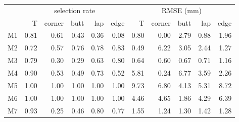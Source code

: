 \begin{tabular}{lrrrrrrrrrr}
\toprule
 & \multicolumn{5}{c}{selection rate} & \multicolumn{5}{c}{RMSE (mm)} \\
 & T & corner & butt & lap & edge & T & corner & butt & lap & edge \\
\midrule
M1 & 0.81 & 0.61 & 0.43 & 0.36 & 0.08 & 0.80 & 0.00 & 2.79 & 0.88 & 1.96 \\
M2 & 0.72 & 0.57 & 0.76 & 0.78 & 0.83 & 0.49 & 6.22 & 3.05 & 2.44 & 1.27 \\
M3 & 0.79 & 0.30 & 0.29 & 0.63 & 0.80 & 0.64 & 0.60 & 0.67 & 0.71 & 1.16 \\
M4 & 0.90 & 0.53 & 0.49 & 0.73 & 0.52 & 5.81 & 0.24 & 6.77 & 3.59 & 2.26 \\
M5 & 1.00 & 1.00 & 1.00 & 1.00 & 1.00 & 9.73 & 6.80 & 4.13 & 5.31 & 8.72 \\
M6 & 1.00 & 1.00 & 1.00 & 1.00 & 1.00 & 4.46 & 4.65 & 1.86 & 4.29 & 6.39 \\
M7 & 0.93 & 0.25 & 0.46 & 0.80 & 0.77 & 1.55 & 1.24 & 1.30 & 1.42 & 1.28 \\
\bottomrule
\end{tabular}
